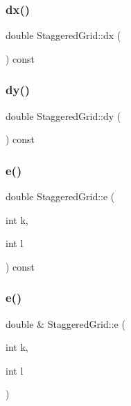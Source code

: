 \mbox{\label{classStaggeredGrid_aec8490affea703cdd73b1febaed68968}} 
\subsubsection{\texorpdfstring{dx()}{dx()}}
{\footnotesize\ttfamily double Staggered\+Grid\+::dx (\begin{DoxyParamCaption}{ }\end{DoxyParamCaption}) const}

\mbox{\label{classStaggeredGrid_abde2da10e0c130fb0f206de64c9b4956}} 
\subsubsection{\texorpdfstring{dy()}{dy()}}
{\footnotesize\ttfamily double Staggered\+Grid\+::dy (\begin{DoxyParamCaption}{ }\end{DoxyParamCaption}) const}

\mbox{\label{classStaggeredGrid_ab897f162fde80ab6163a2ba6782ac1fa}} 
\subsubsection{\texorpdfstring{e()}{e()}\hspace{0.1cm}{\footnotesize\ttfamily [1/2]}}
{\footnotesize\ttfamily double Staggered\+Grid\+::e (\begin{DoxyParamCaption}\item[{int}]{k,  }\item[{int}]{l }\end{DoxyParamCaption}) const}

\mbox{\label{classStaggeredGrid_aae397f47eb73d9e4a92303ed3eb02bb2}} 
\subsubsection{\texorpdfstring{e()}{e()}\hspace{0.1cm}{\footnotesize\ttfamily [2/2]}}
{\footnotesize\ttfamily double \& Staggered\+Grid\+::e (\begin{DoxyParamCaption}\item[{int}]{k,  }\item[{int}]{l }\end{DoxyParamCaption})}


